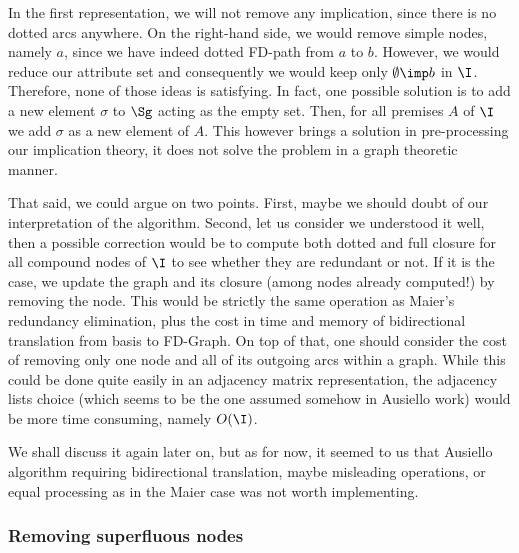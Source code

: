 \begin{figure}[ht]
		
\end{figure}

\vspace{1.2em}

In the first representation, we will not remove any implication, since there
is no dotted arcs anywhere. On the right-hand side, we would remove simple
nodes, namely $a$, since we have indeed dotted FD-path from $a$ to $b$.
However, we would reduce our attribute set and consequently we would keep only
$\emptyset \imp b$ in $\I$. Therefore, none of those ideas is satisfying. In fact, one possible solution is to add a new element $\sigma$ to $\Sg$ acting
as the empty set. Then, for all premises $A$ of $\I$ we add $\sigma$ as a new
element of $A$. This however brings a solution in pre-processing our implication
theory, it does not solve the problem in a graph theoretic manner.

\vspace{1.2em}

That said, we could argue on two points. First, maybe we should doubt of our
interpretation of the algorithm. Second, let us consider we understood it well,
then a possible correction would be to compute both dotted and full closure for
all compound nodes of $\I$ to see whether they are redundant or not. If it is the case, we update the graph and its closure (among nodes already computed!) by removing the node. This would be strictly the same operation as Maier's redundancy elimination, plus the cost in time and memory of bidirectional translation from basis to FD-Graph. On top of that, one should consider the cost of removing only one node and all of its outgoing arcs within a graph. While this could be done quite easily in an adjacency matrix representation, the adjacency lists choice (which seems to be the one assumed somehow in Ausiello work) would be more time consuming, namely $O(\I)$. 

\vspace{1.2em}

We shall discuss it again later on, but as for now, it seemed to us that  Ausiello algorithm requiring bidirectional translation, maybe misleading operations, or equal processing as in the Maier case was not worth implementing.


\subsubsection{Removing superfluous nodes}

